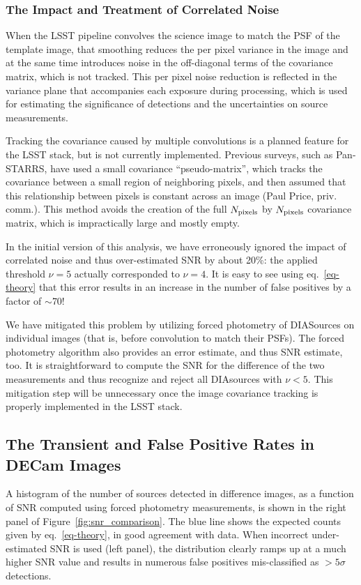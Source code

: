 \subsubsection{The Impact and Treatment of Correlated Noise} 

When the LSST pipeline convolves the science image to match the PSF of the template 
image, that smoothing reduces the per pixel variance in the image and at the same
time introduces noise in the off-diagonal terms of the covariance matrix, which is 
not tracked. This per pixel noise reduction is reflected in the variance plane that 
accompanies each exposure during processing, which is used for estimating the 
significance of detections  and the uncertainties on source measurements. 

Tracking the covariance caused by multiple convolutions is a planned feature for
the LSST stack, but is not currently implemented. Previous surveys, such as
Pan-STARRS, have used a small covariance ``pseudo-matrix'', which tracks the
covariance between a small region of neighboring pixels, and then assumed that 
this relationship between pixels is constant across an image (Paul Price, priv. comm.).
This method avoids the creation of the full $N_{\rm pixels}$ by $N_{\rm pixels}$
covariance matrix, which is impractically large and mostly empty.

In the initial version of this analysis, we have erroneously ignored the impact
of correlated noise and thus over-estimated SNR by about 20\%: the applied 
threshold $\nu=5$ actually corresponded to $\nu=4$. It is easy to see using
eq.~\ref{eq-theory} that this error results in an increase in the number of false
positives by a factor of $\sim$70!  

We have mitigated this problem by utilizing forced photometry of DIASources
on individual images (that is, before convolution to match their PSFs). The
forced photometry algorithm also provides an error estimate, and thus SNR
estimate, too. It is straightforward to compute the SNR for the difference of
the two measurements and thus recognize and reject all DIAsources with 
$\nu < 5$. This mitigation step will be unnecessary once the image covariance
tracking is properly implemented in the LSST stack. 


\subsection{The Transient and False Positive Rates in DECam Images} 

A histogram of the number of sources detected in difference images, as a function
of SNR computed using forced photometry measurements, is shown in the right panel 
of Figure~\ref{fig:snr_comparison}. The blue line shows the expected counts given
by eq.~\ref{eq-theory}, in good agreement with data. When incorrect under-estimated 
SNR is used (left panel), the distribution clearly ramps up at a much higher SNR value 
and results in numerous false positives mis-classified as $>5 \sigma$ detections.


